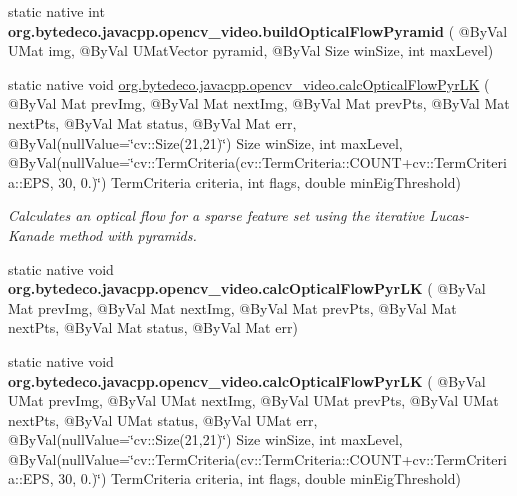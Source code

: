 \begin{DoxyCompactItemize}
\item 
\mbox{\label{group__video__track_gaf360444a172db3927b2b365318968bc7}} 
static native int {\bfseries org.\+bytedeco.\+javacpp.\+opencv\+\_\+video.\+build\+Optical\+Flow\+Pyramid} ( @By\+Val U\+Mat img, @By\+Val U\+Mat\+Vector pyramid, @By\+Val Size win\+Size, int max\+Level)
\item 
static native void \hyperlink{group__video__track_ga5336cf64b4b2f82bf7c08551017fda66}{org.\+bytedeco.\+javacpp.\+opencv\+\_\+video.\+calc\+Optical\+Flow\+Pyr\+LK} ( @By\+Val Mat prev\+Img, @By\+Val Mat next\+Img, @By\+Val Mat prev\+Pts, @By\+Val Mat next\+Pts, @By\+Val Mat status, @By\+Val Mat err, @By\+Val(null\+Value=\char`\"{}cv\+::\+Size(21,21)\char`\"{}) Size win\+Size, int max\+Level, @By\+Val(null\+Value=\char`\"{}cv\+::\+Term\+Criteria(cv\+::\+Term\+Criteria\+::\+C\+O\+U\+NT+cv\+::\+Term\+Criteria\+::\+E\+PS, 30, 0.)\char`\"{}) Term\+Criteria criteria, int flags, double min\+Eig\+Threshold)
\begin{DoxyCompactList}\small\item\em Calculates an optical flow for a sparse feature set using the iterative Lucas-\/\+Kanade method with pyramids. \end{DoxyCompactList}\item 
\mbox{\label{group__video__track_ga70e86dff3479aed1a5dd009fcbf7c3d2}} 
static native void {\bfseries org.\+bytedeco.\+javacpp.\+opencv\+\_\+video.\+calc\+Optical\+Flow\+Pyr\+LK} ( @By\+Val Mat prev\+Img, @By\+Val Mat next\+Img, @By\+Val Mat prev\+Pts, @By\+Val Mat next\+Pts, @By\+Val Mat status, @By\+Val Mat err)
\item 
\mbox{\label{group__video__track_gaca1b2a6891af84a47c0615cc72fe7978}} 
static native void {\bfseries org.\+bytedeco.\+javacpp.\+opencv\+\_\+video.\+calc\+Optical\+Flow\+Pyr\+LK} ( @By\+Val U\+Mat prev\+Img, @By\+Val U\+Mat next\+Img, @By\+Val U\+Mat prev\+Pts, @By\+Val U\+Mat next\+Pts, @By\+Val U\+Mat status, @By\+Val U\+Mat err, @By\+Val(null\+Value=\char`\"{}cv\+::\+Size(21,21)\char`\"{}) Size win\+Size, int max\+Level, @By\+Val(null\+Value=\char`\"{}cv\+::\+Term\+Criteria(cv\+::\+Term\+Criteria\+::\+C\+O\+U\+NT+cv\+::\+Term\+Criteria\+::\+E\+PS, 30, 0.)\char`\"{}) Term\+Criteria criteria, int flags, double min\+Eig\+Threshold)
\item 
\mbox{\label{group__video__track_ga04584a2b791126000b147324067a66e1}} 

\end{DoxyCompactItemize}
